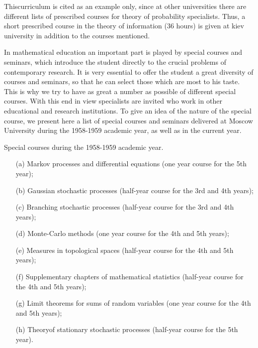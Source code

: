 This\pageoriginale curriculum is cited as an example only, since at
other universities there are different lists of prescribed courses for
theory of probability specialists. Thus, a short prescribed course in
the theory of information (36 hours) is given at kiev university in
addition to the courses mentioned.

In mathematical education an important part is played by special
courses and seminars, which introduce the student directly to the
crucial problems of contemporary research. It is very essential to
offer the student a great diversity of courses and seminars, so that
he can select those which are most to his taste. This is why we try to
have as great a number as possible of different special courses. With
this end in view specialists are invited who work in other educational
and research institutions. To give an idea of the nature of the
special course, we present here a list of special courses and seminars
delivered at Moscow University during the 1958-1959 academic year, as
well as in the current year. 

Special courses during the 1958-1959 academic year.
\begin{itemize}
\item[(a)] Markov processes and differential equations (one year
  course for the 5th year);

\item[(b)] Gaussian stochastic processes (half-year course for the 3rd
  and 4th years);

\item[(c)] Branching stochastic  processes (half-year course for the
  3rd and 4th years);

\item[(d)] Monte-Carlo methods (one year course for the 4th and 5th years);

\item[(e)] Measures in topological spaces (half-year course for the
  4th and 5th years);

\item[(f)] Supplementary chapters of mathematical statistics
  (half-year course for the 4th and 5th years);

\item[(g)] Limit theorems for sums of random variables (one year
  course for the 4th and 5th years);

\item[(h)] Theory\pageoriginale of stationary stochastic processes
  (half-year course for the 5th year).
\end{itemize}


